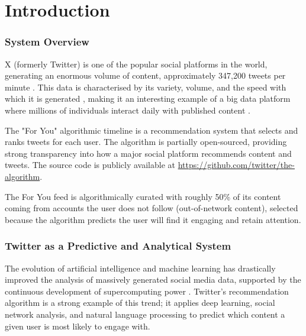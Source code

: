 \documentclass[]
{UCD_CS_41820_Report}
\begin{document}
\maketitle


\tableofcontents


\chapter{Introduction}
\subsection{System Overview}

X (formerly Twitter) is one of the popular social platforms in the world, generating an enormous volume of content, approximately 347,200 tweets per minute \cite{domo2022}. This data is characterised by its variety, volume, and the speed with which it is generated \cite{casado2015}, making it an interesting example of a big data platform where millions of individuals interact daily with published content \cite{gadek2018, wang2010}.

The "For You" algorithmic timeline is a recommendation system that selects and ranks tweets for each user. The algorithm is partially open-sourced, providing strong transparency into how a major social platform recommends content and tweets. The source code is publicly available at \url{https://github.com/twitter/the-algorithm}.

The For You feed is algorithmically curated with roughly 50\% of its content coming from accounts the user does not follow (out-of-network content), selected because the algorithm predicts the user will find it engaging and retain attention.

\subsection{Twitter as a Predictive and Analytical System}

The evolution of artificial intelligence and machine learning has drastically improved the analysis of massively generated social media data, supported by the continuous development of supercomputing power \cite{duan2019}. Twitter's recommendation algorithm is a strong example of this trend; it applies deep learning, social network analysis, and natural language processing to predict which content a given user is most likely to engage with.
\end{document}
